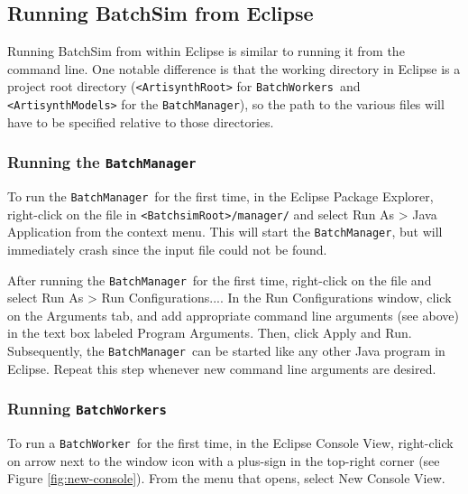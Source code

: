 \documentclass{article}
\newcommand{\AS}{<ArtisynthRoot>}
\newcommand{\AM}{<ArtisynthModels>}
\newcommand{\BS}{<BatchsimRoot>}
\newcommand{\BM}{{\tt BatchManager}}
\newcommand{\BW}{{\tt BatchWorker}}
\newcommand{\BWs}{{\tt BatchWorkers}}
\begin{document}
\subsection{Running BatchSim from Eclipse}

Running BatchSim from within Eclipse is similar to running it from the command line. One notable difference is that the working directory in Eclipse is a project root directory ({\tt \AS} for \BWs\ and {\tt \AM} for the \BM), so the path to the various files will have to be specified relative to those directories.

\subsubsection{Running the \BM}

To run the \BM\ for the first time, in the Eclipse {\sf Package Explorer}, right-click on the  file in {\tt \BS/manager/} and select {\sf Run As > Java Application} from the context menu. This will start the \BM, but will immediately crash since the input file could not be found.

After running the \BM\ for the first time, right-click on the  file and select {\sf Run As > Run Configurations...}. In the {\sf Run Configurations} window, click on the {\sf Arguments} tab, and add appropriate command line arguments (see above) in the text box labeled {\sf Program Arguments}. Then, click {\sf Apply} and {\sf Run}. Subsequently, the \BM\ can be started like any other Java program in Eclipse. Repeat this step whenever new command line arguments are desired.

\subsubsection{Running \BWs}

To run a \BW\ for the first time, in the Eclipse {\sf Console View}, right-click on arrow next to the window icon with a plus-sign in the top-right corner (see Figure \ref{fig:new-console}). From the menu that opens, select {\sf New Console View}.
\end{document}
